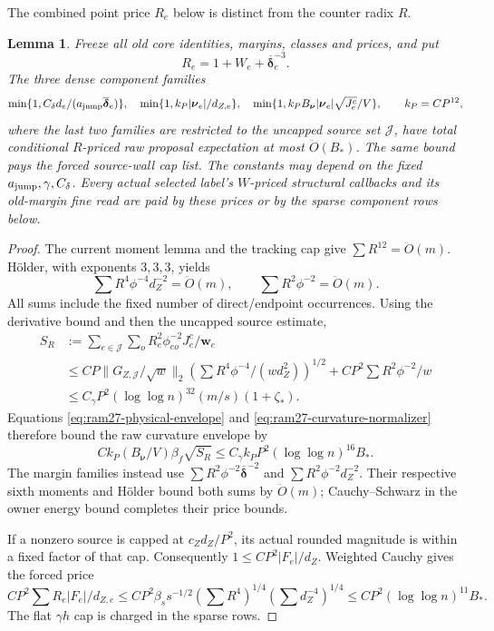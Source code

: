 \documentclass[11pt]{article}
\newtheorem{lemma}[theorem]{Lemma}
\theoremstyle{remark}
\newcommand{\ww}{\mathbf w}
\newcommand{\nnu}{\boldsymbol{\nu}}
\newcommand{\ddeltabar}{\overline{\boldsymbol{\delta}}}
\newcommand{\norm}[1]{\lVert#1\rVert}
\renewcommand{\O}{\ddot{O}}
\begin{document}
The combined point price $R_e$ below is distinct from the counter radix $R$.

\begin{lemma}
\label{lem:ram27-weighted-rates}
Freeze all old core identities, margins, classes and prices, and put
\[
 R_e=1+W_e+\ddeltabar_e^{-3}.
\]
The three dense component families
\[
 \min\{1,C_\delta d_e/(a_{\rm jump}\ddeltabar_e)\},\quad
 \min\{1,k_P|\nnu_e|/d_{Z,e}\},\quad
\min\{1,k_P B_{\nnu}|\nnu_e|\sqrt{J_e^c}/V\},
 \qquad k_P=CP^{12},
\]
where the last two families are restricted to the uncapped source set $\mathcal
J$, have total conditional $R$-priced raw proposal expectation at most
$\O(B_*)$.
The same bound pays the forced source-wall cap list.
The constants may depend on the fixed $a_{\rm jump},\gamma,C_\delta$.
Every actual selected label's $W$-priced structural callbacks and its old-margin
fine read are paid by these prices or by the sparse component rows below.
\end{lemma} \begin{proof} The current moment lemma and the tracking cap give
$\sum R^{12}=\O(m)$.
H\"older, with exponents $3,3,3$, yields
\[
 \sum R^4\phi^{-4}d_Z^{-2}=\O(m),
 \qquad \sum R^2\phi^{-2}=\O(m).
\]
All sums include the fixed number of direct/endpoint occurrences.
Using the derivative bound and then the uncapped source estimate,
\begin{align*}
 S_R&:=\sum_{e\in\mathcal J}\sum_o R_e^2\phi_{eo}^{-2}J_e^c/\ww_e\\
 &\le CP\norm{G_{Z,\mathcal J}/\sqrt w}_2
       \left(\sum R^4\phi^{-4}/(w d_Z^2)\right)^{1/2}
       +CP^2\sum R^2\phi^{-2}/w\\
 &\le C_\gamma P^2(\log\log n)^{32}(m/s)(1+\zeta_*).
\end{align*}
Equations \eqref{eq:ram27-physical-envelope} and
\eqref{eq:ram27-curvature-normalizer} therefore bound the raw curvature envelope
by
\[
 C k_P(B_{\nnu}/V)\beta_f\sqrt{S_R}
           \le C_\gamma k_PP^2(\log\log n)^{16}B_*.
\]
The margin families instead use $\sum R^2\phi^{-2}\ddeltabar^{-2}$ and $\sum
R^2\phi^{-2}d_Z^{-2}$.
Their respective sixth moments and H\"older bound both sums by $\O(m)$;
Cauchy--Schwarz in the owner energy bound completes their price bounds.

If a nonzero source is capped at $c_Zd_Z/P^2$, its actual rounded magnitude is
within a fixed factor of that cap.
Consequently $1\le CP^2|F_e|/d_Z$.
Weighted Cauchy gives the forced price
\[
 CP^2\sum R_e|F_e|/d_{Z,e}
 \le CP^2\beta_s s^{-1/2}
          (\sum R^4)^{1/4}(\sum d_Z^{-4})^{1/4}
 \le CP^2(\log\log n)^{11}B_*.
\]
The flat $\gamma h$ cap is charged in the sparse rows.


\end{proof}
\end{document}
